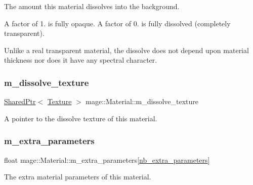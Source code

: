 The amount this material dissolves into the background.

A factor of 1. is fully opaque. A factor of 0. is fully dissolved (completely transparent).

Unlike a real transparent material, the dissolve does not depend upon material thickness nor does it have any spectral character. \hypertarget{structmage_1_1_material_aa68e02ed3da6000effc3aadcc99fa4b5}{}\label{structmage_1_1_material_aa68e02ed3da6000effc3aadcc99fa4b5} 
\subsubsection{\texorpdfstring{m\+\_\+dissolve\+\_\+texture}{m\_dissolve\_texture}}
{\footnotesize\ttfamily \hyperlink{namespacemage_a1e01ae66713838a7a67d30e44c67703e}{Shared\+Ptr}$<$ \hyperlink{classmage_1_1_texture}{Texture} $>$ mage\+::\+Material\+::m\+\_\+dissolve\+\_\+texture\hspace{0.3cm}{\ttfamily [private]}}

A pointer to the dissolve texture of this material. \hypertarget{structmage_1_1_material_a1918cc7a273b625dadb99c03307459fa}{}\label{structmage_1_1_material_a1918cc7a273b625dadb99c03307459fa} 
\subsubsection{\texorpdfstring{m\+\_\+extra\+\_\+parameters}{m\_extra\_parameters}}
{\footnotesize\ttfamily float mage\+::\+Material\+::m\+\_\+extra\+\_\+parameters\mbox{[}\hyperlink{structmage_1_1_material_a91e2bfd0c66c244bbae0faddbee1119f}{nb\+\_\+extra\+\_\+parameters}\mbox{]}\hspace{0.3cm}{\ttfamily [private]}}

The extra material parameters of this material. \hypertarget{structmage_1_1_material_a8b584541ab8bfc527f856c68bb0152e7}{}\label{structmage_1_1_material_a8b584541ab8bfc527f856c68bb0152e7} 
